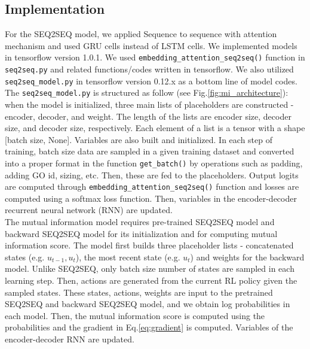 \documentclass[letterpaper]{article}
\begin{document}
\subsection{Implementation}
For the SEQ2SEQ model, we applied Sequence to sequence with attention mechanism and used GRU cells instead of LSTM cells. We implemented models in tensorflow version 1.0.1. We used \texttt{embedding\_attention\_seq2seq()} function in \texttt{seq2seq.py} and related functions/codes written in tensorflow. We also utilized \texttt{seq2seq\_model.py} in tensorflow version 0.12.x as a bottom line of model codes.\\
The \texttt{seq2seq\_model.py} is structured as follow (see Fig.\ref{fig:mi_architecture}): when the model is initialized, three main lists of placeholders are constructed - encoder, decoder, and weight. The length of the lists are encoder size, decoder size, and decoder size, respectively. Each element of a list is a tensor with a shape [batch size, None]. Variables are also built and initialized. In each step of training, batch size data are sampled in a given training dataset and converted into a proper format in the function \texttt{get\_batch()} by operations such as padding, adding GO id, sizing, etc. Then, these are fed to the placeholders. Output logits are computed through \texttt{embedding\_attention\_seq2seq()} function and losses are computed using a softmax loss function. Then, variables in the encoder-decoder recurrent neural network (RNN) are updated. \\
The mutual information model requires pre-trained SEQ2SEQ model and backward SEQ2SEQ model for its initialization and for computing mutual information score. The model first builds three placeholder lists - concatenated states (e.g. $u_{t-1},u_t$), the most recent state (e.g. $u_t$) and weights for the backward model. Unlike SEQ2SEQ, only batch size number of states are sampled in each learning step. Then, actions are generated from the current RL policy given the sampled states. These states, actions, weights are input to the pretrained SEQ2SEQ and backward SEQ2SEQ model, and we obtain log probabilities in each model. Then, the mutual information score is computed using the probabilities and the gradient in Eq.\ref{eq:gradient} is computed. Variables of the encoder-decoder RNN are updated.
\end{document}
